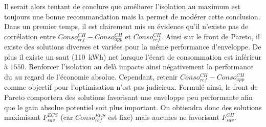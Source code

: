 Il serait alors tentant de conclure que améliorer l’isolation au maximum est
toujours une bonne recommandation mais la  permet
de modérer cette conclusion. Dans un premier temps, il est clairement mis en évidence
qu’il n’existe pas de corrélation entre $Conso_{ref}^{CH} - Conso_{app}^{CH}$ et
$Conso_{ref}^{CH}$. Ainsi sur le front de Pareto, il existe des solutions diverses
et variées pour la même performance d’enveloppe. De plus il existe un saut (\SI{110}{kWh})
net lorsque l’écart de consommation est inférieur à $1550$. Renforcer l’isolation
au delà impacte ainsi négativement la performance du  au regard de l’économie
absolue. Cependant, retenir $Conso_{ref}^{CH} - Conso_{app}^{CH}$ comme objectif
pour l’optimisation n’est pas judicieux. Formulé ainsi, le front de Pareto
comportera des solutions favorisant une enveloppe peu performante afin que le gain
absolue potentiel soit plus important. On obtiendra donc des solutions
maximisant $F_{sav}^{ECS}$ (car $Conso_{ref}^{ECS}$ est fixe) mais aucunes ne
favorisant $F_{sav}^{CH}$.


